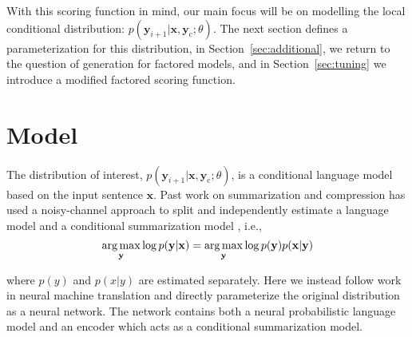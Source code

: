 \documentclass[11pt,a4paper]{article}
\newcommand{\xvec}{\mathbf{x}}
\newcommand{\yvec}{\mathbf{y}}
\newcommand{\context}{\mathbf{y}_{\mathrm{c}}}
\def\argmax{\operatornamewithlimits{arg\,max}}
\begin{document}
With this scoring function in mind, our main focus will
be on modelling the local conditional distribution: $p(\yvec_{i+1} |
\xvec, \context; \theta)$. The next section defines a parameterization for
this distribution,
in Section~\ref{sec:additional}, we return to
the question of generation for factored models, and 
in Section~\ref{sec:tuning} we introduce
a modified factored scoring function.

 
\section{Model}
\label{sec:model}

The distribution of interest, $p(\yvec_{i+1} | \xvec, \context ; \theta)$, is  a conditional language model based on the input
sentence $\xvec$. Past work on summarization and compression has used
a noisy-channel approach to split and independently estimate a 
language model and a conditional summarization model \cite{banko2000headline,knight2002summarization,daume2002noisy},
i.e.,
\[ \argmax_{\yvec} \log p(\yvec | \xvec) = \argmax_{\yvec} \log p(\yvec) p(\xvec | \yvec) \]

\noindent where $p(y)$ and $p(x|y)$ are estimated separately.  Here we
instead follow work in neural machine translation and directly
parameterize the original distribution as a neural network. The
network contains both a neural probabilistic language model and an
encoder which acts as a conditional summarization model.
\end{document}
